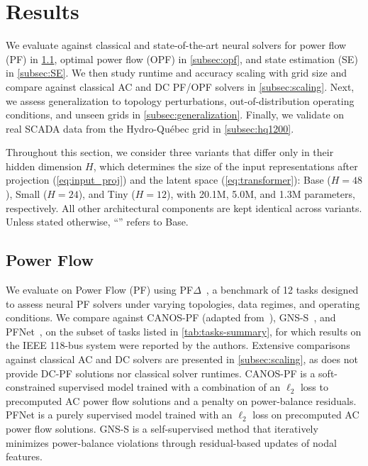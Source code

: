 
\section{Results}
\label{sec:experiments}


We evaluate \genco against classical and state-of-the-art neural solvers for power flow (PF) in \cref{subsec:pf}, optimal power flow (OPF) in \cref{subsec:opf}, and state estimation (SE) in \cref{subsec:SE}. We then study runtime and accuracy scaling with grid size and compare against classical AC and DC PF/OPF solvers in \cref{subsec:scaling}. Next, we assess generalization to topology perturbations, out-of-distribution operating conditions, and unseen grids in \cref{subsec:generalization}. Finally, we validate \genco on real SCADA data from the Hydro-Québec grid in \cref{subsec:hq1200}.

Throughout this section, we consider three \genco variants that differ only in their hidden dimension $H$, which determines the size of the input representations after projection (\cref{eq:input_proj}) and the latent space (\cref{eq:transformer}): \genco Base ($H=48$), Small ($H=24$), and Tiny ($H=12$), with 20.1M, 5.0M, and 1.3M parameters, respectively. All other architectural components are kept identical across variants. Unless stated otherwise, ``\genco'' refers to \genco Base.



\subsection{Power Flow}
\label{subsec:pf}

We evaluate \genco on Power Flow (PF) using PF$\Delta$~\cite{NEURIPS2025_d000ef56}, a benchmark of 12 tasks designed to assess neural PF solvers under varying topologies, data regimes, and operating conditions. We compare \genco against CANOS-PF (adapted from~\cite{piloto2024}), GNS-S~\cite{DONON2020106547}, and PFNet~\cite{lin2024powerflownet}, on the subset of tasks listed in \cref{tab:tasks-summary}, for which results on the IEEE 118-bus system were reported by the authors. Extensive comparisons against classical AC and DC solvers are presented in \cref{subsec:scaling}, as \pfdelta does not provide DC-PF solutions nor classical solver runtimes. CANOS-PF is a soft-constrained supervised model trained with a combination of an $\ell_2$ loss to precomputed AC power flow solutions and a penalty on power-balance residuals. PFNet is a purely supervised model trained with an $\ell_2$ loss on precomputed AC power flow solutions. GNS-S is a self-supervised method that iteratively minimizes power-balance violations through residual-based updates of nodal features.\\


